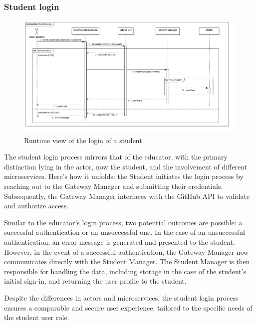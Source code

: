 \subsubsection*{Student login}
\begin{figure}[h!]
    \centering
    \includegraphics[width=1\linewidth]{2.ArchitecturalDesign/res/StudentLogin.jpg}
    \caption{Runtime view of the login of a student}
    \label{fig:student_login}
\end{figure}

The student login process mirrors that of the educator, with the primary distinction lying in the actor, now the student, and the involvement of different microservices. Here's how it unfolds: the Student initiates the login process by reaching out to the Gateway Manager and submitting their credentials. Subsequently, the Gateway Manager interfaces with the GitHub API to validate and authorize access.

Similar to the educator's login process, two potential outcomes are possible: a successful authentication or an unsuccessful one. In the case of an unsuccessful authentication, an error message is generated and presented to the student. However, in the event of a successful authentication, the Gateway Manager now communicates directly with the Student Manager. The Student Manager is then responsible for handling the data, including storage in the case of the student's initial sign-in, and returning the user profile to the student.

Despite the differences in actors and microservices, the student login process ensures a comparable and secure user experience, tailored to the specific needs of the student user role.

\newpage

